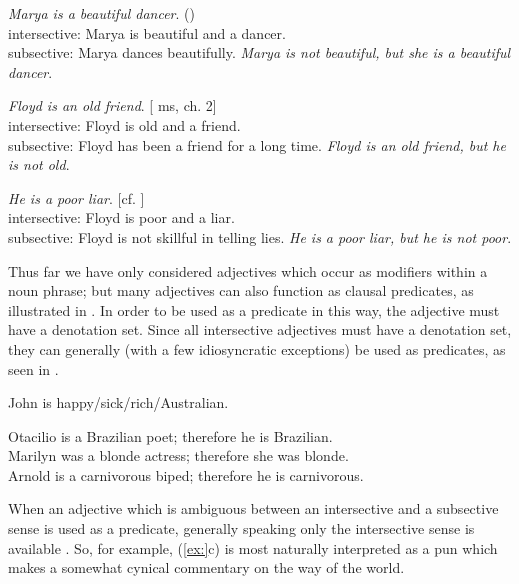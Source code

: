 \ea
\ea  \textit{Marya is a beautiful dancer}.   (\citealt{Siegel1976})\\
intersective: Marya is beautiful and a dancer.\\
subsective: Marya dances beautifully.
\ex  \textit{Marya is not beautiful, but she is a beautiful dancer}.
\z \z

\ea
\ea \textit{Floyd is an old friend}.   [\citealt{Morzycki2013} ms, ch. 2]\\
intersective: Floyd is old and a friend.\\
subsective: Floyd has been a friend for a long time.
\ex  \textit{Floyd is an old friend, but he is not old}.
\z \z

\ea
\ea  \textit{He is a poor liar}.   [cf. \citealt{Bolinger1967}]\\
intersective: Floyd is poor and a liar.\\
subsective: Floyd is not skillful in telling lies.
\ex  \textit{He is a poor liar, but he is not poor}.
\z \z


Thus far we have only considered adjectives which occur as modifiers within a noun phrase; but many adjectives can also function as clausal predicates, as illustrated in . In order to be used as a predicate in this way, the adjective must have a denotation set. Since all intersective adjectives must have a denotation set, they can generally (with a few idiosyncratic exceptions) be used as predicates, as seen in .


\ea
John is happy/sick/rich/Australian.
\z

\ea
\ea Otacilio is a Brazilian poet; therefore he is Brazilian.\\
\ex Marilyn was a blonde actress; therefore she was blonde.\\
\ex Arnold is a carnivorous biped; therefore he is carnivorous.
                       \z
\z


When an adjective which is ambiguous between an intersective and a subsective sense is used as a predicate, generally speaking only the intersective sense is available . So, for example, (\ref{ex:}c) is most naturally interpreted as a pun which makes a somewhat cynical commentary on the way of the world.


\ea
{}
                       \z
\z



